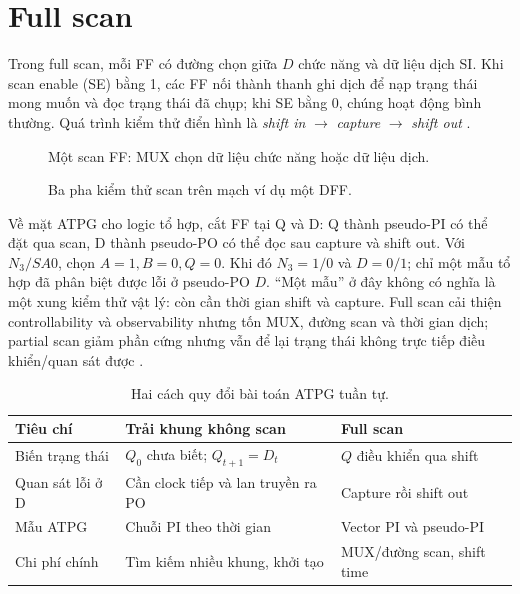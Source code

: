 \section{Full scan}
\label{sec:p4-full-scan}
Trong full scan, mỗi FF có đường chọn giữa $D$ chức năng và dữ liệu dịch
SI. Khi scan enable (SE) bằng 1, các FF nối thành thanh ghi dịch để nạp
trạng thái mong muốn và đọc trạng thái đã chụp; khi SE bằng 0, chúng hoạt
động bình thường. Quá trình kiểm thử điển hình là \emph{shift in}
$\rightarrow$ \emph{capture} $\rightarrow$ \emph{shift out}
\cite{p4_eichelberger1977,p4_nptel_scan}.
\begin{figure}[H]
\centering
\caption{Một scan FF: MUX chọn dữ liệu chức năng hoặc dữ liệu dịch.}
\label{fig:p4-scan-ff}
\end{figure}
\begin{figure}[H]
\centering
\caption{Ba pha kiểm thử scan trên mạch ví dụ một DFF.}
\label{fig:p4-scan-timing}
\end{figure}

Về mặt ATPG cho logic tổ hợp, cắt FF tại Q và D: Q thành pseudo-PI có thể
đặt qua scan, D thành pseudo-PO có thể đọc sau capture và shift out. Với
$N_3/SA0$, chọn $A=1,B=0,Q=0$. Khi đó $N_3=1/0$ và $D=0/1$;
chỉ một mẫu tổ hợp đã phân biệt được lỗi ở pseudo-PO $D$. ``Một mẫu'' ở đây
không có nghĩa là một xung kiểm thử vật lý: còn cần thời gian shift và
capture. Full scan cải thiện controllability và observability nhưng tốn
MUX, đường scan và thời gian dịch; partial scan giảm phần cứng nhưng vẫn
để lại trạng thái không trực tiếp điều khiển/quan sát được
\cite{p4_nptel_scan}.

\begin{table}[H]
\centering\small
\begin{tabular}{@{}p{3.0cm}p{4.2cm}p{4.2cm}@{}}
\toprule
Tiêu chí & Trải khung không scan & Full scan\\
\midrule
Biến trạng thái & $Q_0$ chưa biết; $Q_{t+1}=D_t$ & $Q$ điều khiển qua shift\\
Quan sát lỗi ở D & Cần clock tiếp và lan truyền ra PO & Capture rồi shift out\\
Mẫu ATPG & Chuỗi PI theo thời gian & Vector PI và pseudo-PI\\
Chi phí chính & Tìm kiếm nhiều khung, khởi tạo & MUX/đường scan, shift time\\
\bottomrule
\end{tabular}
\caption{Hai cách quy đổi bài toán ATPG tuần tự.}
\label{tab:p4-compare}
\end{table}

